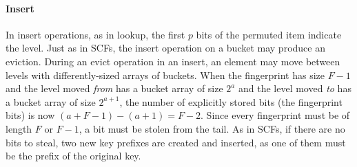\documentclass[letterpaper,twocolumn,10pt]{article}
\newcommand{\ints}{\mathbb{Z}}
\newcommand{\TCF}{SCF}
\newcommand{\MTCF}{MSCF}
\newcommand{\TCF}{TCF}
\newcommand{\MTCF}{MTCF}
\begin{document}



\paragraph{Insert}
In insert operations, as in lookup, the first $p$ bits of the permuted item indicate the level. %
Just as in \TCF{}s, the insert operation on a bucket may produce an eviction. %
During an evict operation in an insert, an element may move between levels with differently-sized arrays of buckets.
When the fingerprint has size $F-1$ and the level moved {\em from} has a bucket array of size $2^a$ and the level moved {\em to} has a bucket array of size $2^{a+1}$, the number of explicitly stored bits (the fingerprint bits) is now $(a + F - 1) - (a+1) = F - 2$.
Since every fingerprint must be of length $F$ or $F-1$, a bit must be stolen from the tail. %
As in \TCF{}s, if there are no bits to steal, two new key prefixes are created and inserted, as one of them must be the prefix of the original key. %
\end{document}
